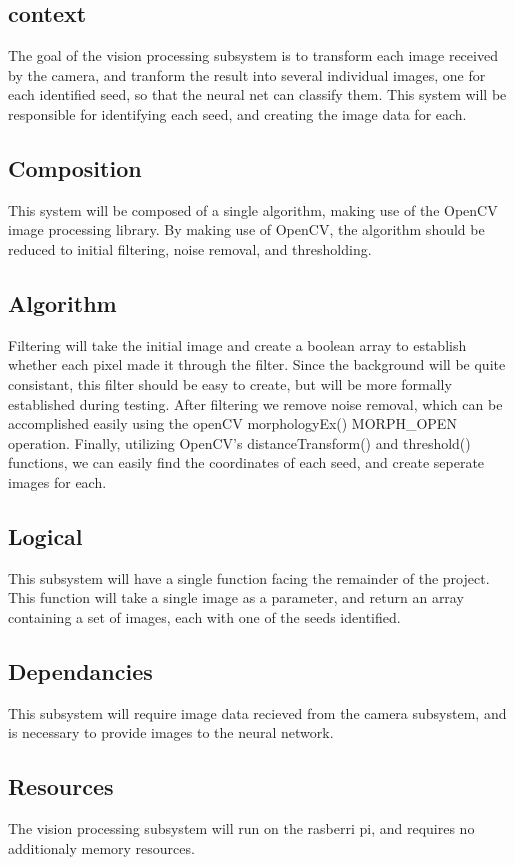 \subsection{context}

The goal of the vision processing subsystem is to transform each image received by the camera, and tranform the result into several
individual images, one for each identified seed, so that the neural net can classify them. 
This system will be responsible for identifying each seed,
and creating the image data for each.

\subsection{Composition} 

This system will be composed of a single algorithm, making use of the OpenCV image processing library.
By making use of OpenCV, the algorithm should be reduced to initial filtering, noise removal, and thresholding.

\subsection{Algorithm}
Filtering will take the initial image and create a boolean array to establish whether each pixel made it through the filter.
Since the background will be quite consistant, this filter should be easy to create, but will be more formally established during testing.
After filtering we remove noise removal, which can be accomplished easily using the openCV morphologyEx() MORPH_OPEN operation.
Finally, utilizing OpenCV's distanceTransform() and threshold() functions, we can easily find the coordinates of each seed, and 
create seperate images for each.

\subsection{Logical}

This subsystem will have a single function facing the remainder of the project. 
This function will take a single image as a parameter, and return an array containing
a set of images, each with one of the seeds identified. 

\subsection{Dependancies} 

This subsystem will require image data recieved from the camera subsystem, and is necessary to
provide images to the neural network.

\subsection{Resources} 

The vision processing subsystem will run on the rasberri pi, 
and requires no additionaly memory resources.



